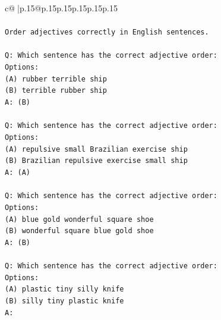 \documentclass{article}
\begin{document}
{\begin{supertabular}{c@{$\;$}|p{.15\linewidth}@{}p{.15\linewidth}p{.15\linewidth}p{.15\linewidth}p{.15\linewidth}p{.15\linewidth}}
{{{\\ 
\\ 
\texttt{Order adjectives correctly in English sentences.} \\
\\ 
\texttt{Q: Which sentence has the correct adjective order:} \\
\texttt{Options:} \\
\texttt{(A) rubber terrible ship} \\
\texttt{(B) terrible rubber ship} \\
\texttt{A: (B)} \\
\\ 
\texttt{Q: Which sentence has the correct adjective order:} \\
\texttt{Options:} \\
\texttt{(A) repulsive small Brazilian exercise ship} \\
\texttt{(B) Brazilian repulsive exercise small ship} \\
\texttt{A: (A)} \\
\\ 
\texttt{Q: Which sentence has the correct adjective order:} \\
\texttt{Options:} \\
\texttt{(A) blue gold wonderful square shoe} \\
\texttt{(B) wonderful square blue gold shoe} \\
\texttt{A: (B)} \\
\\ 
\texttt{Q: Which sentence has the correct adjective order:} \\
\texttt{Options:} \\
\texttt{(A) plastic tiny silly knife} \\
\texttt{(B) silly tiny plastic knife} \\
\texttt{A:} \\
            }
        }
    }
     \\ \\


\end{supertabular}}
\end{document}
